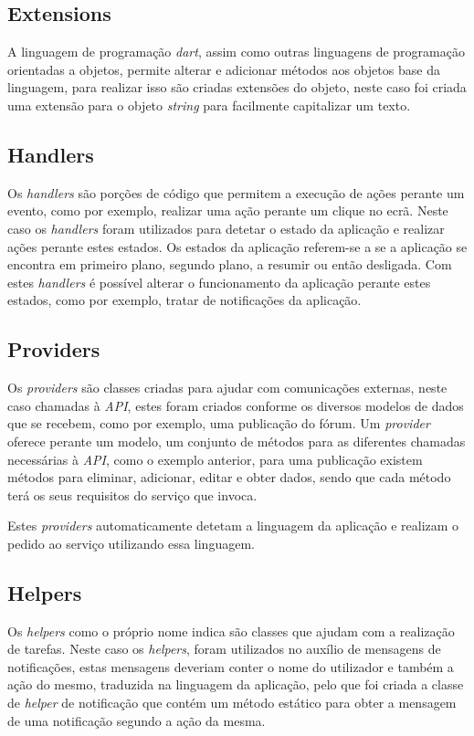 \subsection{Extensions}
A linguagem de programação \textit{dart}, assim como outras linguagens de programação orientadas a objetos, permite alterar e adicionar métodos aos objetos base da linguagem, para realizar isso são criadas extensões do objeto, neste caso foi criada uma extensão para o objeto \textit{string} para facilmente capitalizar um texto.

\subsection{Handlers}
Os \textit{handlers} são porções de código que permitem a execução de ações perante um evento, como por exemplo, realizar uma ação perante um clique no ecrã. Neste caso os \textit{handlers} foram utilizados para detetar o estado da aplicação e realizar ações perante estes estados. Os estados da aplicação referem-se a se a aplicação se encontra em primeiro plano, segundo plano, a resumir ou então desligada. Com estes \textit{handlers} é possível alterar o funcionamento da aplicação perante estes estados, como por exemplo, tratar de notificações da aplicação.

\subsection{Providers}
Os \textit{providers} são classes criadas para ajudar com comunicações externas, neste caso chamadas à \textit{API}, estes foram criados conforme os diversos modelos de dados que se recebem, como por exemplo, uma publicação do fórum. Um \textit{provider} oferece perante um modelo, um conjunto de métodos para as diferentes chamadas necessárias à \textit{API}, como o exemplo anterior, para uma publicação existem métodos para eliminar, adicionar, editar e obter dados, sendo que cada método terá os seus requisitos do serviço que invoca.

Estes \textit{providers} automaticamente detetam a linguagem da aplicação e realizam o pedido ao serviço utilizando essa linguagem.

\subsection{Helpers}
Os \textit{helpers} como o próprio nome indica são classes que ajudam com a realização de tarefas. Neste caso os \textit{helpers}, foram utilizados no auxílio de mensagens de notificações, estas mensagens deveriam conter o nome do utilizador e também a ação do mesmo, traduzida na linguagem da aplicação, pelo que foi criada a classe de \textit{helper} de notificação que contém um método estático para obter a mensagem de uma notificação segundo a ação da mesma.